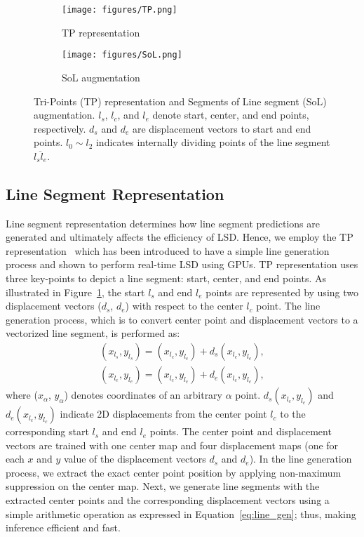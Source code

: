 \documentclass[letterpaper]{article} \usepackage{aaai22}  \usepackage{times}  \usepackage{helvet}  \usepackage{courier}  \usepackage[hyphens]{url}  \usepackage{graphicx} \urlstyle{rm} \def\UrlFont{\rm}  \usepackage{natbib}  \usepackage{caption} \DeclareCaptionStyle{ruled}{labelfont=normalfont,labelsep=colon,strut=off} \frenchspacing  \setlength{\pdfpagewidth}{8.5in}  \setlength{\pdfpageheight}{11in}  \usepackage{algorithm}
\begin{document}
\begin{figure}[t!]
    \centering
     \begin{subfigure}[b]{0.48\columnwidth}
        \centering\texttt{[image: figures/TP.png]}
         \caption{TP representation}
         \label{fig:tp}
     \end{subfigure}
    \begin{subfigure}[b]{0.48\columnwidth}
        \centering\texttt{[image: figures/SoL.png]}
         \caption{SoL augmentation}
         \label{fig:sol}
     \end{subfigure}
\caption{Tri-Points (TP) representation and Segments of Line segment (SoL) augmentation. $l_s$, $l_c$, and $l_e$ denote start, center, and end points, respectively. $d_s$ and $d_e$ are displacement vectors to start and end points. $l_0 \sim l_2$ indicates internally dividing points of the line segment $\overline{l_s l_e}$.}
\label{fig:line_representation}
\end{figure}

\subsection{Line Segment Representation}
Line segment representation determines how line segment predictions are generated and ultimately affects the efficiency of LSD.
Hence, we employ the TP representation~\cite{huang2020tp} which has been introduced to have a simple line generation process and shown to perform real-time LSD using GPUs.
TP representation uses three key-points to depict a line segment: start, center, and end points.
As illustrated in Figure~\ref{fig:tp}, the start $l_s$ and end $l_e$ points are represented by using two displacement vectors ($d_s$, $d_e$) with respect to the center $l_c$ point.
The line generation process, which is to convert center point and displacement vectors to a vectorized line segment, is performed as:
\begin{eqnarray}
(x_{l_s}, y_{l_s}) = (x_{l_c}, y_{l_c}) + d_s(x_{l_c}, y_{l_c}), \nonumber \\
(x_{l_e}, y_{l_e}) = (x_{l_c}, y_{l_c}) + d_e(x_{l_c}, y_{l_c}),
\label{eq:line_gen}
\end{eqnarray}
where ($x_\alpha$, $y_\alpha$) denotes coordinates of an arbitrary $\alpha$ point.
$d_s(x_{l_c}, y_{l_c})$ and $d_e(x_{l_c}, y_{l_c})$ indicate 2D displacements from the center point $l_c$ to the corresponding start $l_s$ and end $l_e$ points.
The center point and displacement vectors are trained with one center map and four displacement maps (one for each $x$ and $y$ value of the displacement vectors $d_s$ and $d_e$).
In the line generation process, we extract the exact center point position by applying non-maximum suppression on the center map.
Next, we generate line segments with the extracted center points and the corresponding displacement vectors using a simple arithmetic operation as expressed in Equation~\ref{eq:line_gen}; thus, making inference efficient and fast.
\end{document}
